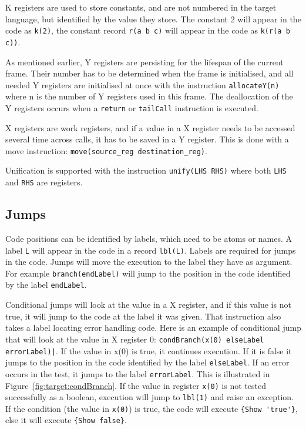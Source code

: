 \documentclass[a4paper]{memoir}
\begin{document}
K registers are used to store constants, and are not numbered in the target
language, but identified by
the value they store. The constant 2 will appear in the code as
\lstinline!k(2)!, the constant record \lstinline!r(a b c)! will appear in the
code as \lstinline!k(r(a b c))!.


As mentioned earlier, Y registers are persisting for the lifespan of the current frame. Their number has to be determined when the frame is initialised, and all needed Y registers are initialised at once with the instruction \lstinline!allocateY(n)! where n is the number of Y registers used in this frame.
The deallocation of the Y registers occurs when a \lstinline!return! or
\lstinline!tailCall! instruction is executed.

X registers are work registers, and if a value in a X register needs to be accessed several time across calls, it has to be saved in a Y register. This is done with a move instruction: \lstinline!move(source_reg destination_reg)!.

Unification is supported with the instruction \lstinline!unify(LHS RHS)! where
both \lstinline!LHS! and \lstinline!RHS! are registers.

\subsection{Jumps}\label{sec:opcode:jumps}
Code positions can be identified by labels, which need to be atoms or names. A label \lstinline!L! will appear in the code in a record \lstinline!lbl(L)!. 
Labels are required for jumps in the code. 
Jumps will move the execution to the label they have as argument. For example \lstinline!branch(endLabel)! will jump to the position in the code identified by the label \lstinline!endLabel!.

Conditional jumps will look at the value in a X register, and if this value is
not true, it will jump to the code at the label it was given. That instruction
also takes a label locating error handling code. Here is an example of
conditional jump that will look at the value in X register 0:
\lstinline!condBranch(x(0) elseLabel errorLabel)|!. If the value in x(0) is
true, it continues execution. If it is false it jumps to the position in the
code identified by the label \lstinline!elseLabel!. If an error occurs in the
test, it jumps to the label \lstinline!errorLabel!. This is illustrated in Figure~\ref{fig:target:condBranch}.
If the value in register \lstinline!x(0)! is not tested successfully as a
boolean, execution will jump to \lstinline!lbl(1)! and raise an exception. If
the condition (the value in \lstinline!x(0)!) is true, the code will execute
\lstinline!{Show 'true'}!, else it will execute \lstinline!{Show false}!.
\end{document}
